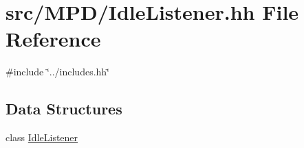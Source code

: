 \hypertarget{IdleListener_8hh}{
\section{src/\-M\-P\-D/\-Idle\-Listener.hh \-File \-Reference}
\label{IdleListener_8hh}
}
{\ttfamily \#include \char`\"{}../includes.\-hh\char`\"{}}\*
\subsection*{\-Data \-Structures}
\begin{DoxyCompactItemize}
\item 
class \hyperlink{classIdleListener}{\-Idle\-Listener}
\end{DoxyCompactItemize}
